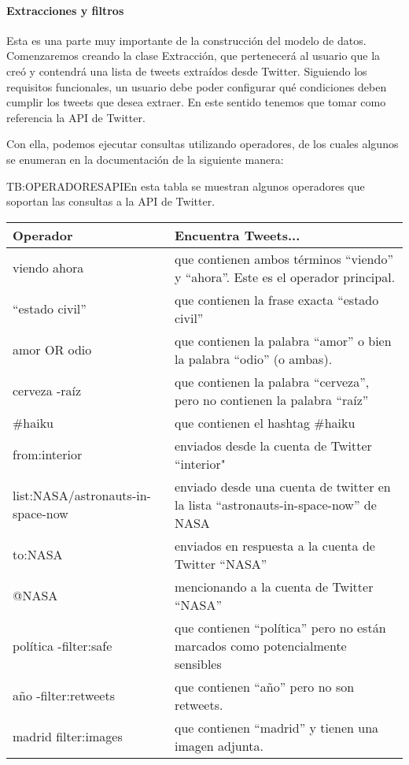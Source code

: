 \paragraph{Extracciones y filtros}
Esta es una parte muy importante de la construcción del modelo de datos. Comenzaremos creando la clase Extracción, que pertenecerá al usuario que la creó y contendrá una lista de tweets extraídos desde Twitter.
Siguiendo los requisitos funcionales, un usuario debe poder configurar qué condiciones deben cumplir los tweets que desea extraer. En este sentido tenemos que tomar como referencia la API de Twitter. 

Con ella, podemos ejecutar consultas utilizando operadores, de los cuales algunos se enumeran en la documentación de la siguiente manera:
\begin{table}[Operadores de Twitter API]{TB:OPERADORESAPI}{En esta tabla se muestran algunos operadores que soportan las consultas a la API de Twitter.}
\begin{tabular}{|p{3.5cm}|p{11.5cm}|}
\hline
\textbf{Operador} & \textbf{Encuentra Tweets...} \\
\hline \hline
viendo ahora & que contienen ambos términos ``viendo'' y ``ahora''. Este es el operador principal.\\
``estado civil'' & que contienen la frase exacta ``estado civil''\\
amor OR odio & que contienen la palabra ``amor'' o bien la palabra ``odio'' (o ambas).\\
cerveza -raíz & que contienen la palabra ``cerveza'', pero no contienen la palabra ``raíz''\\
\#haiku & que contienen el hashtag \#haiku \\
from:interior & enviados desde la cuenta de Twitter ``interior"\\
list:NASA/astronauts-in-space-now & enviado desde una cuenta de twitter en la lista ``astronauts-in-space-now'' de NASA\\
to:NASA & enviados en respuesta a la cuenta de Twitter ``NASA''\\
@NASA & mencionando a la cuenta de Twitter ``NASA''\\
política -filter:safe & que contienen ``política'' pero no están marcados como potencialmente sensibles \\
año -filter:retweets & que contienen ``año'' pero no son retweets.\\
madrid filter:images & que contienen ``madrid'' y tienen una imagen adjunta.\\

\end{tabular}
\end{table}
